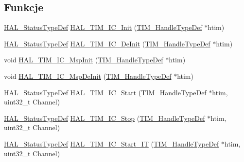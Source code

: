 \subsection*{Funkcje}
\begin{DoxyCompactItemize}
\item 
\hyperlink{stm32f4xx__hal__def_8h_a63c0679d1cb8b8c684fbb0632743478f}{H\+A\+L\+\_\+\+Status\+Type\+Def} \hyperlink{group___t_i_m___exported___functions___group4_ga342aa1098891f55f59c7867afff589c1}{H\+A\+L\+\_\+\+T\+I\+M\+\_\+\+I\+C\+\_\+\+Init} (\hyperlink{struct_t_i_m___handle_type_def}{T\+I\+M\+\_\+\+Handle\+Type\+Def} $\ast$htim)
\item 
\hyperlink{stm32f4xx__hal__def_8h_a63c0679d1cb8b8c684fbb0632743478f}{H\+A\+L\+\_\+\+Status\+Type\+Def} \hyperlink{group___t_i_m___exported___functions___group4_ga2fc9af96c4ec45ba9057e182012f3586}{H\+A\+L\+\_\+\+T\+I\+M\+\_\+\+I\+C\+\_\+\+De\+Init} (\hyperlink{struct_t_i_m___handle_type_def}{T\+I\+M\+\_\+\+Handle\+Type\+Def} $\ast$htim)
\item 
void \hyperlink{group___t_i_m___exported___functions___group4_ga202723f23bc46b29b16145f9cceabbbb}{H\+A\+L\+\_\+\+T\+I\+M\+\_\+\+I\+C\+\_\+\+Msp\+Init} (\hyperlink{struct_t_i_m___handle_type_def}{T\+I\+M\+\_\+\+Handle\+Type\+Def} $\ast$htim)
\item 
void \hyperlink{group___t_i_m___exported___functions___group4_gad1aa484ec0f0559908d9d8128614e7ad}{H\+A\+L\+\_\+\+T\+I\+M\+\_\+\+I\+C\+\_\+\+Msp\+De\+Init} (\hyperlink{struct_t_i_m___handle_type_def}{T\+I\+M\+\_\+\+Handle\+Type\+Def} $\ast$htim)
\item 
\hyperlink{stm32f4xx__hal__def_8h_a63c0679d1cb8b8c684fbb0632743478f}{H\+A\+L\+\_\+\+Status\+Type\+Def} \hyperlink{group___t_i_m___exported___functions___group4_gaab393018ca6f8fad04a815feb1796ce7}{H\+A\+L\+\_\+\+T\+I\+M\+\_\+\+I\+C\+\_\+\+Start} (\hyperlink{struct_t_i_m___handle_type_def}{T\+I\+M\+\_\+\+Handle\+Type\+Def} $\ast$htim, uint32\+\_\+t Channel)
\item 
\hyperlink{stm32f4xx__hal__def_8h_a63c0679d1cb8b8c684fbb0632743478f}{H\+A\+L\+\_\+\+Status\+Type\+Def} \hyperlink{group___t_i_m___exported___functions___group4_ga1b5edb103cb27dbd5380e9b24d12658f}{H\+A\+L\+\_\+\+T\+I\+M\+\_\+\+I\+C\+\_\+\+Stop} (\hyperlink{struct_t_i_m___handle_type_def}{T\+I\+M\+\_\+\+Handle\+Type\+Def} $\ast$htim, uint32\+\_\+t Channel)
\item 
\hyperlink{stm32f4xx__hal__def_8h_a63c0679d1cb8b8c684fbb0632743478f}{H\+A\+L\+\_\+\+Status\+Type\+Def} \hyperlink{group___t_i_m___exported___functions___group4_gac0e3515f374ec6b9d30609cd683649d6}{H\+A\+L\+\_\+\+T\+I\+M\+\_\+\+I\+C\+\_\+\+Start\+\_\+\+IT} (\hyperlink{struct_t_i_m___handle_type_def}{T\+I\+M\+\_\+\+Handle\+Type\+Def} $\ast$htim, uint32\+\_\+t Channel)

\end{DoxyCompactItemize}
